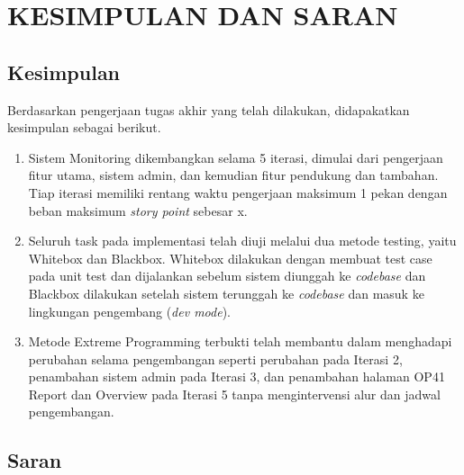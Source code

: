 
\chapter{KESIMPULAN DAN SARAN}


\section{Kesimpulan}
Berdasarkan pengerjaan tugas akhir yang telah dilakukan, didapakatkan kesimpulan sebagai berikut.

\begin{enumerate}
    \item Sistem Monitoring dikembangkan selama 5 iterasi, dimulai dari pengerjaan fitur utama, sistem admin, dan kemudian fitur pendukung dan tambahan. Tiap iterasi memiliki rentang waktu pengerjaan maksimum 1 pekan dengan beban maksimum \textit{story point} sebesar x.
    \item Seluruh task pada implementasi telah diuji melalui dua metode testing, yaitu Whitebox dan Blackbox. Whitebox dilakukan dengan membuat test case pada unit test dan dijalankan sebelum sistem diunggah ke \textit{codebase} dan Blackbox dilakukan setelah sistem terunggah ke \textit{codebase} dan masuk ke lingkungan pengembang (\textit{dev mode}).
    \item Metode Extreme Programming terbukti telah membantu dalam menghadapi perubahan selama pengembangan seperti perubahan pada Iterasi 2, penambahan sistem admin pada Iterasi 3, dan penambahan halaman OP41 Report dan Overview pada Iterasi 5 tanpa mengintervensi alur dan jadwal pengembangan.
\end{enumerate}

\section{Saran}
\blindtext